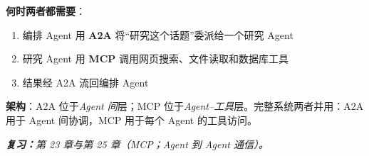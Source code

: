 \begin{questionbox}
\textbf{何时两者都需要}：

\begin{enumerate}
  \item 编排 Agent 用 \textbf{A2A} 将“研究这个话题”委派给一个研究 Agent
  \item 研究 Agent 用 \textbf{MCP} 调用网页搜索、文件读取和数据库工具
  \item 结果经 A2A 流回编排 Agent
\end{enumerate}

\textbf{架构}：A2A 位于\emph{Agent 间}层；MCP 位于\emph{Agent–工具}层。完整系统两者并用：A2A 用于 Agent 间协调，MCP 用于每个 Agent 的工具访问。

\emph{\textbf{复习：}第 23 章与第 25 章（MCP；Agent 到 Agent 通信）。}
\end{questionbox}

